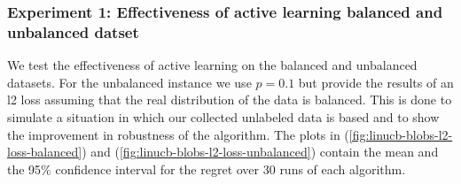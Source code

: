 \documentclass{article}
\begin{document}
\subsubsection{Experiment 1: Effectiveness of active learning balanced and unbalanced datset}
We test the effectiveness of active learning on the balanced and unbalanced datasets.
For the unbalanced instance we use $p = 0.1$ but provide the results of an l2 loss assuming that the real distribution of the data is balanced.
This is done to simulate a situation in which our collected unlabeled data is based and to show the improvement in robustness of the
algorithm. The plots in (\ref{fig:linucb-blobs-l2-loss-balanced}) and (\ref{fig:linucb-blobs-l2-loss-unbalanced})  contain the mean and the 95\% confidence interval for the
regret over 30 runs of each algorithm.
\end{document}
